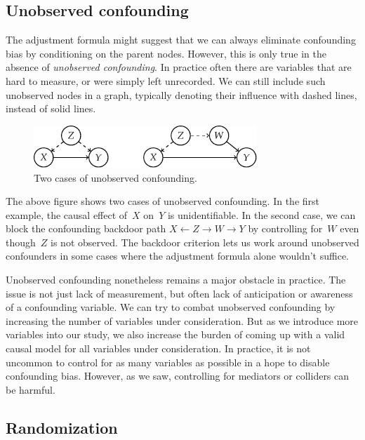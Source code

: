 \documentclass{tufte-book}
\begin{document}
\hypertarget{unobserved-confounding}{%
\subsection{Unobserved confounding}\label{unobserved-confounding}}

The adjustment formula might suggest that we can always eliminate
confounding bias by conditioning on the parent nodes. However, this is
only true in the absence of \emph{unobserved
confounding}. In practice often there are
variables that are hard to measure, or were simply left unrecorded. We
can still include such unobserved nodes in a graph, typically denoting
their influence with dashed lines, instead of solid lines.

\begin{figure}
\centering
\includegraphics[width=0.75\textwidth,height=\textheight]{assets/causal-unob-conf}
\caption{Two cases of unobserved confounding.}
\end{figure}

The above figure shows two cases of unobserved confounding. In the first
example, the causal effect of~\(X\) on~\(Y\) is unidentifiable. In the
second case, we can block the confounding backdoor path
\(X\leftarrow Z\rightarrow W\rightarrow Y\) by controlling for~\(W\)
even though~\(Z\) is not observed. The backdoor criterion lets us work
around unobserved confounders in some cases where the adjustment formula
alone wouldn't suffice.

Unobserved confounding nonetheless remains a major obstacle in practice.
The issue is not just lack of measurement, but often lack of
anticipation or awareness of a confounding variable. We can try to
combat unobserved confounding by increasing the number of variables
under consideration. But as we introduce more variables into our study,
we also increase the burden of coming up with a valid causal model for
all variables under consideration. In practice, it is not uncommon to
control for as many variables as possible in a hope to disable
confounding bias. However, as we saw, controlling for mediators or
colliders can be harmful.

\hypertarget{randomization}{%
\subsection{Randomization}\label{randomization}}
\end{document}
